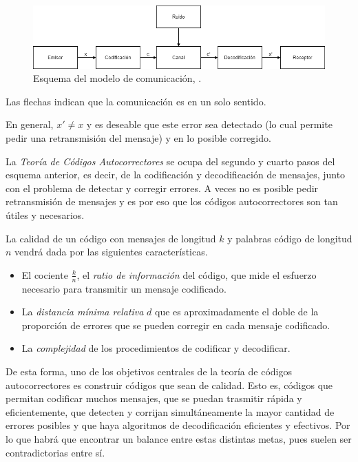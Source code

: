 \begin{figure}[H]
	\center
	\includegraphics[scale=0.5]{figures/Diagrama_comunicacion.png}
	\caption{Esquema del modelo de comunicación, \cite{Podesta_2006}.}
\end{figure}

Las flechas indican que la comunicación es en un solo sentido.

En general, $x' \neq x$ y es deseable que este error sea detectado (lo cual permite pedir una retransmisión del mensaje) y en lo posible corregido.

La \emph{Teoría de Códigos Autocorrectores} se ocupa del segundo y cuarto pasos del esquema anterior, es decir, de la codificación y decodificación de mensajes, junto con el problema de detectar y corregir errores. A veces no es posible pedir retransmisión de mensajes y es por eso que los códigos autocorrectores son tan útiles y necesarios.

La calidad de un código con mensajes de longitud $k$ y palabras código de longitud $n$ vendrá dada por las siguientes características.

\begin{itemize}
    \item El cociente $\frac{k}{n}$, el \emph{ratio de información} del código, que mide el esfuerzo necesario para transmitir un mensaje codificado.
    \item La \emph{distancia mínima relativa} $d$ que es aproximadamente el doble de la proporción de errores que se pueden corregir en cada mensaje codificado.
    \item La \emph{complejidad} de los procedimientos de codificar y decodificar.
\end{itemize}

De esta forma, uno de los objetivos centrales de la teoría de códigos autocorrectores es construir códigos que sean de calidad. Esto es, códigos que permitan codificar muchos mensajes, que se puedan trasmitir rápida y eficientemente, que detecten y corrijan simultáneamente la mayor cantidad de errores posibles y que haya algoritmos de decodificación eficientes y efectivos. Por lo que habrá que encontrar un balance entre estas distintas metas, pues suelen ser contradictorias entre sí.

